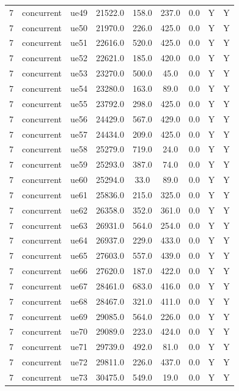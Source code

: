 \begin{table}[ht]
\begin{tabular}{|c|c|c|c|c|c|c|c|c|}
7 & concurrent & ue49 & 21522.0 & 158.0 & 237.0 & 0.0 & Y & Y \\
7 & concurrent & ue50 & 21970.0 & 226.0 & 425.0 & 0.0 & Y & Y \\
7 & concurrent & ue51 & 22616.0 & 520.0 & 425.0 & 0.0 & Y & Y \\
7 & concurrent & ue52 & 22621.0 & 185.0 & 420.0 & 0.0 & Y & Y \\
7 & concurrent & ue53 & 23270.0 & 500.0 & 45.0 & 0.0 & Y & Y \\
7 & concurrent & ue54 & 23280.0 & 163.0 & 89.0 & 0.0 & Y & Y \\
7 & concurrent & ue55 & 23792.0 & 298.0 & 425.0 & 0.0 & Y & Y \\
7 & concurrent & ue56 & 24429.0 & 567.0 & 429.0 & 0.0 & Y & Y \\
7 & concurrent & ue57 & 24434.0 & 209.0 & 425.0 & 0.0 & Y & Y \\
7 & concurrent & ue58 & 25279.0 & 719.0 & 24.0 & 0.0 & Y & Y \\
7 & concurrent & ue59 & 25293.0 & 387.0 & 74.0 & 0.0 & Y & Y \\
7 & concurrent & ue60 & 25294.0 & 33.0 & 89.0 & 0.0 & Y & Y \\
7 & concurrent & ue61 & 25836.0 & 215.0 & 325.0 & 0.0 & Y & Y \\
7 & concurrent & ue62 & 26358.0 & 352.0 & 361.0 & 0.0 & Y & Y \\
7 & concurrent & ue63 & 26931.0 & 564.0 & 254.0 & 0.0 & Y & Y \\
7 & concurrent & ue64 & 26937.0 & 229.0 & 433.0 & 0.0 & Y & Y \\
7 & concurrent & ue65 & 27603.0 & 557.0 & 439.0 & 0.0 & Y & Y \\
7 & concurrent & ue66 & 27620.0 & 187.0 & 422.0 & 0.0 & Y & Y \\
7 & concurrent & ue67 & 28461.0 & 683.0 & 416.0 & 0.0 & Y & Y \\
7 & concurrent & ue68 & 28467.0 & 321.0 & 411.0 & 0.0 & Y & Y \\
7 & concurrent & ue69 & 29085.0 & 564.0 & 226.0 & 0.0 & Y & Y \\
7 & concurrent & ue70 & 29089.0 & 223.0 & 424.0 & 0.0 & Y & Y \\
7 & concurrent & ue71 & 29739.0 & 492.0 & 81.0 & 0.0 & Y & Y \\
7 & concurrent & ue72 & 29811.0 & 226.0 & 437.0 & 0.0 & Y & Y \\
7 & concurrent & ue73 & 30475.0 & 549.0 & 19.0 & 0.0 & Y & Y \\

\end{tabular}
\end{table}
